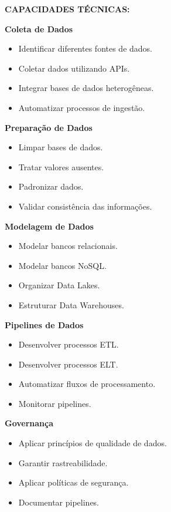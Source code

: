 \textbf{CAPACIDADES TÉCNICAS:}

\textbf{Coleta de Dados}

\begin{itemize}
\item Identificar diferentes fontes de dados.
\item Coletar dados utilizando APIs.
\item Integrar bases de dados heterogêneas.
\item Automatizar processos de ingestão.
\end{itemize}

\textbf{Preparação de Dados}

\begin{itemize}
\item Limpar bases de dados.
\item Tratar valores ausentes.
\item Padronizar dados.
\item Validar consistência das informações.
\end{itemize}

\textbf{Modelagem de Dados}

\begin{itemize}
\item Modelar bancos relacionais.
\item Modelar bancos NoSQL.
\item Organizar Data Lakes.
\item Estruturar Data Warehouses.
\end{itemize}

\textbf{Pipelines de Dados}

\begin{itemize}
\item Desenvolver processos ETL.
\item Desenvolver processos ELT.
\item Automatizar fluxos de processamento.
\item Monitorar pipelines.
\end{itemize}

\textbf{Governança}

\begin{itemize}
\item Aplicar princípios de qualidade de dados.
\item Garantir rastreabilidade.
\item Aplicar políticas de segurança.
\item Documentar pipelines.
\end{itemize}

